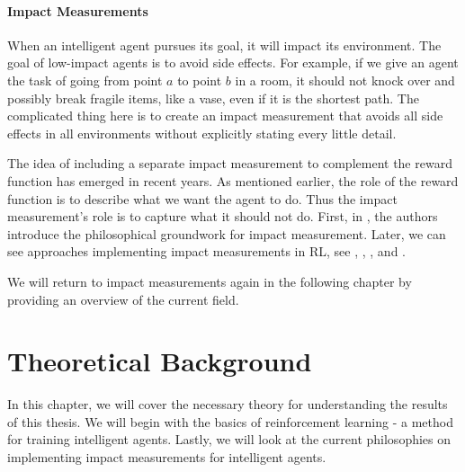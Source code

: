 \documentclass[12pt,A4]{report}
\theoremstyle{definition}
\begin{document}

\subsubsection{Impact Measurements}

When an intelligent agent pursues its goal, it will impact its environment. The goal of low-impact agents is to avoid side effects. For example, if we give an agent the task of going from point $a$ to point $b$ in a room, it should not knock over and possibly break fragile items, like a vase, even if it is the shortest path. The complicated thing here is to create an impact measurement that avoids all side effects in all environments without explicitly stating every little detail.

The idea of including a separate impact measurement to complement the reward function has emerged in recent years. As mentioned earlier, the role of the reward function is to describe what we want the agent to do. Thus the impact measurement's role is to capture what it should not do. First, in \citet{ArmstrongLevinstein}, the authors introduce the philosophical groundwork for impact measurement. Later, we can see approaches implementing impact measurements in RL, see \citet{Eysenbach}, \citet{Krakovna19}, \citet{Turner19}, and \citet{Krakovna20}.

We will return to impact measurements again in the following chapter by providing an overview of the current field. 


 


\chapter{Theoretical Background}
In this chapter, we will cover the necessary theory for understanding the results of this thesis. We will begin with the basics of reinforcement learning - a method for training intelligent agents. Lastly, we will look at the current philosophies on implementing impact measurements for intelligent agents. 
\end{document}
